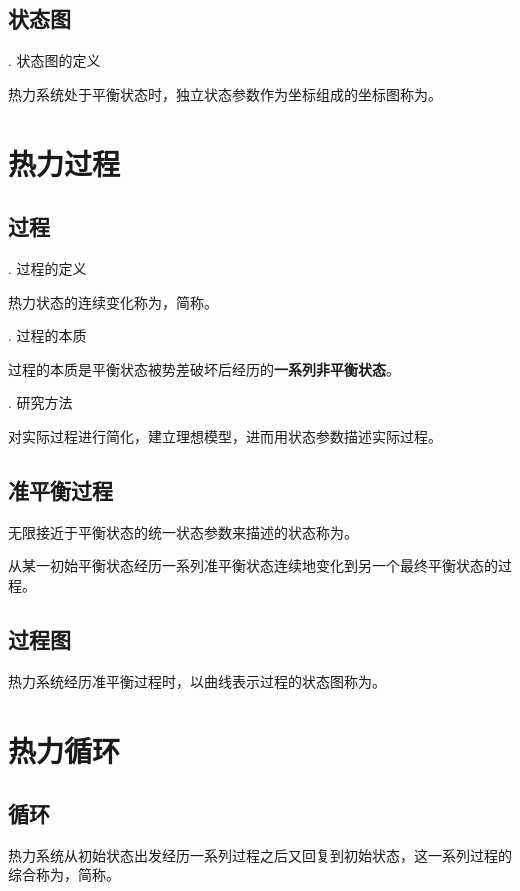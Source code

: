\subsection{状态图}
. 状态图的定义

热力系统处于平衡状态时，独立状态参数作为坐标组成的坐标图称为。

\section{热力过程}

\subsection{过程}
. 过程的定义

热力状态的连续变化称为，简称。\vspace*{0.5em}

. 过程的本质

过程的本质是平衡状态被势差破坏后经历的\textbf{一系列非平衡状态}。\vspace*{0.5em}

. 研究方法

对实际过程进行简化，建立理想模型，进而用状态参数描述实际过程。\\

\subsection{准平衡过程}

\tdefination[准平衡状态]
无限接近于平衡状态的统一状态参数来描述的状态称为。

从某一初始平衡状态经历一系列准平衡状态连续地变化到另一个最终平衡状态的过程。
\vspace*{1em}

\subsection{过程图}
\tdefination[过程图]
热力系统经历准平衡过程时，以曲线表示过程的状态图称为。
\vspace*{1em}

\section{热力循环}
\subsection{循环}
\tdefination[循环]
热力系统从初始状态出发经历一系列过程之后又回复到初始状态，这一系列过程的综合称为，简称。\vspace*{0.5em}

